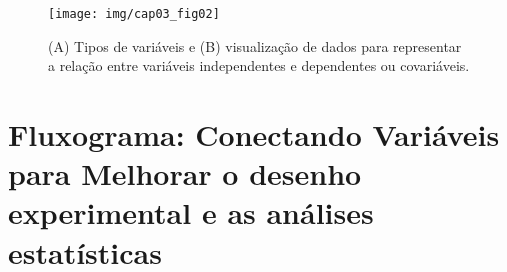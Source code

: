 \documentclass[
]{book}
\begin{document}
\begin{figure}

{\centering \texttt{[image: img/cap03\_fig02]} 

}

\caption{(A) Tipos de variáveis e (B) visualização de dados para representar a relação entre variáveis independentes e dependentes ou covariáveis.}\label{fig:fig-box}
\end{figure}

\hypertarget{fluxograma-conectando-variuxe1veis-para-melhorar-o-desenho-experimental-e-as-anuxe1lises-estatuxedsticas}{%
\section{Fluxograma: Conectando Variáveis para Melhorar o desenho experimental e as análises estatísticas}\label{fluxograma-conectando-variuxe1veis-para-melhorar-o-desenho-experimental-e-as-anuxe1lises-estatuxedsticas}}
\end{document}
